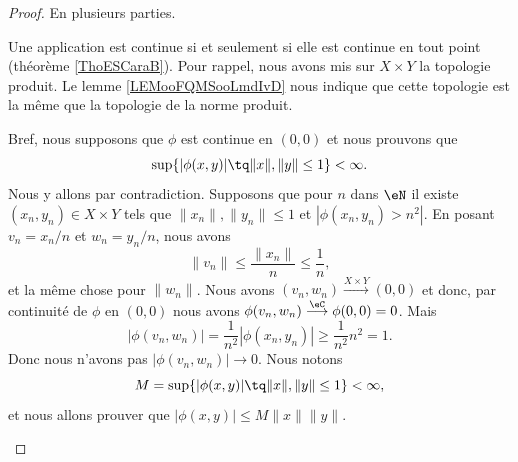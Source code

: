 \begin{proof}
	En plusieurs parties.
	\begin{subproof}
		\spitem[\ref{ITEMooWMFBooOWPzgP} \( \Rightarrow\) \ref{ITEMooSFQZooHNcWwH}]
		Une application est continue si et seulement si elle est continue en tout point (théorème \ref{ThoESCaraB}).
		\spitem[\ref{ITEMooSFQZooHNcWwH} \( \Rightarrow\) \ref{ITEMooWSWQooSYzOol}]
		Pour rappel, nous avons mis sur \( X\times Y\) la topologie produit. Le lemme \ref{LEMooFQMSooLmdIvD} nous indique que cette topologie est la même que la topologie de la norme produit.

		Bref, nous supposons que \( \phi\) est continue en \( (0,0)\) et nous prouvons que
		\begin{equation}
			\sup\{ | \phi(x,y) |\tq \| x \|, \| y \|\leq 1 \}<\infty.
		\end{equation}
		Nous y allons par contradiction. Supposons que pour \( n\) dans \( \eN\) il existe \( (x_n,y_n)\in X\times Y\) tels que \( \| x_n \|, \| y_n \|\leq 1\)  et \( | \phi(x_n,y_n)>n^2 |\). En posant \( v_n=x_n/n\) et \( w_n=y_n/n\), nous avons
		\begin{equation}
			\| v_n \|\leq \frac{ \| x_n \| }{ n }\leq \frac{1}{ n },
		\end{equation}
		et la même chose pour \( \| w_n \|\). Nous avons \( (v_n,w_n)\stackrel{X\times Y}{\longrightarrow}(0,0)\) et donc, par continuité de \( \phi\) en \( (0,0)\) nous avons \( \phi(v_n,w_n)\stackrel{\eC}{\longrightarrow}\phi(0,0)=0\). Mais
		\begin{equation}
			| \phi(v_n,w_n) |=\frac{1}{ n^2 }| \phi(x_n,y_n) |\geq \frac{1}{ n^2 }n^2=1.
		\end{equation}
		Donc nous n'avons pas \( | \phi(v_n,w_n) |\to 0\).
		\spitem[\ref{ITEMooWSWQooSYzOol} \( \Rightarrow\) \ref{ITEMooRKHQooMVXlYD}]
		Nous notons
		\begin{equation}
			M=   \sup\{ | \phi(x,y) |\tq \| x \|, \| y \|\leq 1 \}<\infty,
		\end{equation}
		et nous allons prouver que \( | \phi(x,y) |\leq M\| x \|\| y \|\).


\end{subproof}
\end{proof}
